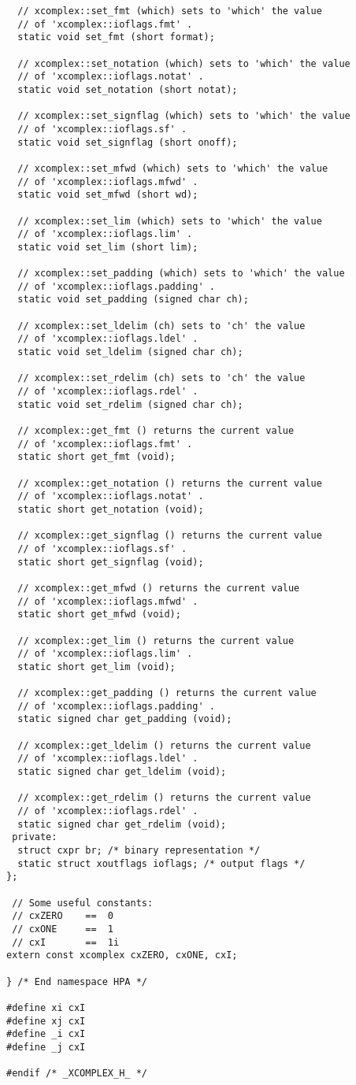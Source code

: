 \documentclass{article}
\begin{document}
\begin{verbatim}
  // xcomplex::set_fmt (which) sets to 'which' the value
  // of 'xcomplex::ioflags.fmt' .
  static void set_fmt (short format);

  // xcomplex::set_notation (which) sets to 'which' the value
  // of 'xcomplex::ioflags.notat' .
  static void set_notation (short notat);

  // xcomplex::set_signflag (which) sets to 'which' the value
  // of 'xcomplex::ioflags.sf' .
  static void set_signflag (short onoff);

  // xcomplex::set_mfwd (which) sets to 'which' the value
  // of 'xcomplex::ioflags.mfwd' .
  static void set_mfwd (short wd);

  // xcomplex::set_lim (which) sets to 'which' the value
  // of 'xcomplex::ioflags.lim' .
  static void set_lim (short lim);

  // xcomplex::set_padding (which) sets to 'which' the value
  // of 'xcomplex::ioflags.padding' .
  static void set_padding (signed char ch);

  // xcomplex::set_ldelim (ch) sets to 'ch' the value
  // of 'xcomplex::ioflags.ldel' .
  static void set_ldelim (signed char ch);

  // xcomplex::set_rdelim (ch) sets to 'ch' the value
  // of 'xcomplex::ioflags.rdel' .
  static void set_rdelim (signed char ch);

  // xcomplex::get_fmt () returns the current value
  // of 'xcomplex::ioflags.fmt' .
  static short get_fmt (void);

  // xcomplex::get_notation () returns the current value
  // of 'xcomplex::ioflags.notat' .
  static short get_notation (void);

  // xcomplex::get_signflag () returns the current value
  // of 'xcomplex::ioflags.sf' .
  static short get_signflag (void);

  // xcomplex::get_mfwd () returns the current value
  // of 'xcomplex::ioflags.mfwd' .
  static short get_mfwd (void);

  // xcomplex::get_lim () returns the current value
  // of 'xcomplex::ioflags.lim' .
  static short get_lim (void);

  // xcomplex::get_padding () returns the current value
  // of 'xcomplex::ioflags.padding' .
  static signed char get_padding (void);

  // xcomplex::get_ldelim () returns the current value
  // of 'xcomplex::ioflags.ldel' .
  static signed char get_ldelim (void);

  // xcomplex::get_rdelim () returns the current value
  // of 'xcomplex::ioflags.rdel' .
  static signed char get_rdelim (void);
 private:
  struct cxpr br; /* binary representation */
  static struct xoutflags ioflags; /* output flags */
};

 // Some useful constants:
 // cxZERO    ==  0
 // cxONE     ==  1
 // cxI       ==  1i 
extern const xcomplex cxZERO, cxONE, cxI;

} /* End namespace HPA */

#define xi cxI
#define xj cxI
#define _i cxI
#define _j cxI

#endif /* _XCOMPLEX_H_ */
\end{verbatim}
\end{document}
